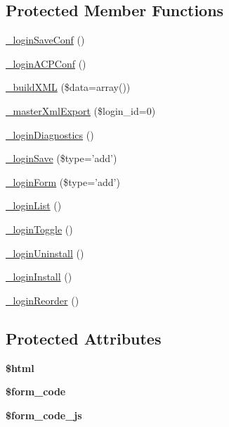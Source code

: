 \subsection*{Protected Member Functions}
\begin{DoxyCompactItemize}
\item 
\hyperlink{classadmin__core__tools__login_a6fa7467795a8f2855216c1f353adbaa4}{\-\_\-login\-Save\-Conf} ()
\item 
\hyperlink{classadmin__core__tools__login_adb0564e0db51057be0ff35243f583d38}{\-\_\-login\-A\-C\-P\-Conf} ()
\item 
\hyperlink{classadmin__core__tools__login_a38d78f721c7c3cd8ffd6b60852f98159}{\-\_\-build\-X\-M\-L} (\$data=array())
\item 
\hyperlink{classadmin__core__tools__login_a5816889dcd72e1a61061db559d3a83d3}{\-\_\-master\-Xml\-Export} (\$login\-\_\-id=0)
\item 
\hyperlink{classadmin__core__tools__login_a66b7374ad1fb1c0b28303701723c43ec}{\-\_\-login\-Diagnostics} ()
\item 
\hyperlink{classadmin__core__tools__login_acee0f69f14994ca11537218a1c91f615}{\-\_\-login\-Save} (\$type='add')
\item 
\hyperlink{classadmin__core__tools__login_a00d4694966372cf910ee88f2ce877c39}{\-\_\-login\-Form} (\$type='add')
\item 
\hyperlink{classadmin__core__tools__login_a2e28e26ed38db0a3d39ce14208eebef9}{\-\_\-login\-List} ()
\item 
\hyperlink{classadmin__core__tools__login_ab92a93392bc844c14c8c18731e3eace4}{\-\_\-login\-Toggle} ()
\item 
\hyperlink{classadmin__core__tools__login_aeeed5f223c880fc48adcc7582b1ab15b}{\-\_\-login\-Uninstall} ()
\item 
\hyperlink{classadmin__core__tools__login_ac459c46a592712939942d07f3b8918c9}{\-\_\-login\-Install} ()
\item 
\hyperlink{classadmin__core__tools__login_aea197365c9220ede0ba29a820c4180d1}{\-\_\-login\-Reorder} ()
\end{DoxyCompactItemize}
\subsection*{Protected Attributes}
\begin{DoxyCompactItemize}
\item 
\hypertarget{classadmin__core__tools__login_a6f96e7fc92441776c9d1cd3386663b40}{{\bfseries \$html}}\label{classadmin__core__tools__login_a6f96e7fc92441776c9d1cd3386663b40}

\item 
\hypertarget{classadmin__core__tools__login_af28aee726fa3eb6c355d08a2ab655e03}{{\bfseries \$form\-\_\-code}}\label{classadmin__core__tools__login_af28aee726fa3eb6c355d08a2ab655e03}

\item 
\hypertarget{classadmin__core__tools__login_ac68fe8a02a2efd63c3271179f4b4fbb7}{{\bfseries \$form\-\_\-code\-\_\-js}}\label{classadmin__core__tools__login_ac68fe8a02a2efd63c3271179f4b4fbb7}

\end{DoxyCompactItemize}

